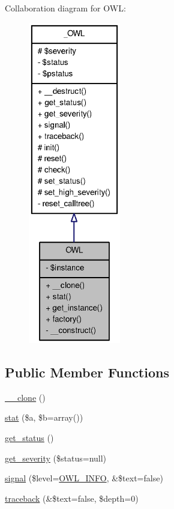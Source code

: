 Collaboration diagram for OWL:\nopagebreak
\begin{figure}[H]
\begin{center}
\leavevmode
\includegraphics[height=400pt]{classOWL__coll__graph}
\end{center}
\end{figure}
\subsection*{Public Member Functions}
\begin{DoxyCompactItemize}
\item 
\hyperlink{classOWL_a4ab99b467f8f388773f14dd37437bd11}{\_\-\_\-clone} ()
\item 
\hyperlink{classOWL_a6537b942a6cab370c296ff5befd8f382}{stat} (\$a, \$b=array())
\item 
\hyperlink{class__OWL_a99ec771fa2c5c279f80152cc09e489a8}{get\_\-status} ()
\item 
\hyperlink{class__OWL_adf9509ef96858be7bdd9414c5ef129aa}{get\_\-severity} (\$status=null)
\item 
\hyperlink{class__OWL_a51ba4a16409acf2a2f61f286939091a5}{signal} (\$level=\hyperlink{owl_8severitycodes_8php_a139328861128689f2f4def6a399d9057}{OWL\_\-INFO}, \&\$text=false)
\item 
\hyperlink{class__OWL_aa29547995d6741b7d2b90c1d4ea99a13}{traceback} (\&\$text=false, \$depth=0)
\end{DoxyCompactItemize}
